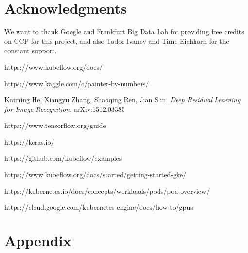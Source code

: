 \documentclass[
	12pt, %
]{fphw}
\begin{document}
\pagebreak
\section{Acknowledgments}

We want to thank Google and Frankfurt Big Data Lab for providing free credits on GCP for this project, and also Todor Ivanov and Timo Eichhorn for the constant support.
\ \\
{}


\begin{thebibliography}{7}

https://www.kubeflow.org/docs/

https://www.kaggle.com/c/painter-by-numbers/

Kaiming He, Xiangyu Zhang, Shaoqing Ren, Jian Sun. \textit{Deep Residual Learning for Image Recognition}, arXiv:1512.03385

https://www.tensorflow.org/guide

https://keras.io/

https://github.com/kubeflow/examples

https://www.kubeflow.org/docs/started/getting-started-gke/

https://kubernetes.io/docs/concepts/workloads/pods/pod-overview/

https://cloud.google.com/kubernetes-engine/docs/how-to/gpus







 
\end{thebibliography}

\pagebreak
\section{Appendix}
\end{document}
